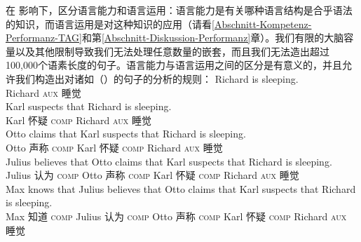  \citet[\S~I.1]{Chomsky65a}在 \citet{Saussure16a}\nocite{Saussure16a-Fr}影响下，区分语言能力和语言运用：语言能力是有关哪种语言结构是合乎语法的知识，而语言运用是对这种知识的应用（请看\ref{Abschnitt-Kompetenz-Performanz-TAG}和第\ref{Abschnitt-Diskussion-Performanz}章）。我们有限的大脑容量以及其他限制导致我们无法处理任意数量的嵌套，而且我们无法造出超过100,000个语素长度的句子。语言能力与语言运用之间的区分是有意义的，并且允许我们构造出对诸如（）的句子的分析的规则：
\eal 
\label{Beispiel-Satzeinbettung}
\ex 
\gll Richard is sleeping.\\
Richard \textsc{aux} 睡觉\\
\ex 
\gll Karl suspects that Richard is sleeping.\\
Karl 怀疑 \textsc{comp} Richard \textsc{aux} 睡觉\\
\ex 
\gll Otto claims that Karl suspects that Richard is sleeping.\\
Otto 声称 \textsc{comp} Karl 怀疑 \textsc{comp} Richard \textsc{aux} 睡觉\\
\ex 
\gll Julius believes that Otto claims that Karl suspects that Richard is sleeping.\\
Julius 认为 \textsc{comp} Otto 声称 \textsc{comp} Karl 怀疑 \textsc{comp} Richard \textsc{aux} 睡觉\\
\ex 
\gll Max knows that Julius believes that Otto claims that Karl suspects that Richard is sleeping.\\
Max 知道 \textsc{comp} Julius 认为 \textsc{comp} Otto 声称 \textsc{comp} Karl 怀疑 \textsc{comp} Richard \textsc{aux} 睡觉\\
